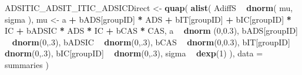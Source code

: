 \documentclass[10pt,dvipsnames,enabledeprecatedfontcommands]{scrartcl}
\newenvironment{Shaded}{\begin{snugshade}}{\end{snugshade}}
\newcommand{\KeywordTok}[1]{\textcolor[rgb]{0.13,0.29,0.53}{\textbf{#1}}}
\newcommand{\DataTypeTok}[1]{\textcolor[rgb]{0.13,0.29,0.53}{#1}}
\newcommand{\DecValTok}[1]{\textcolor[rgb]{0.00,0.00,0.81}{#1}}
\newcommand{\FloatTok}[1]{\textcolor[rgb]{0.00,0.00,0.81}{#1}}
\newcommand{\StringTok}[1]{\textcolor[rgb]{0.31,0.60,0.02}{#1}}
\newcommand{\OperatorTok}[1]{\textcolor[rgb]{0.81,0.36,0.00}{\textbf{#1}}}
\newcommand{\NormalTok}[1]{#1}
\begin{document}
\begin{Shaded}
\begin{Highlighting}[]
\NormalTok{ADSITIC_ADSIT_ITIC_ADSICDirect <-}\StringTok{ }\KeywordTok{quap}\NormalTok{(}
  \KeywordTok{alist}\NormalTok{(}
\NormalTok{    AdiffS }\OperatorTok{~}\StringTok{ }\KeywordTok{dnorm}\NormalTok{( mu, sigma ),}
\NormalTok{    mu <-}\StringTok{ }\NormalTok{a }\OperatorTok{+}\StringTok{ }\NormalTok{bADS[groupID] }\OperatorTok{*}\StringTok{ }\NormalTok{ADS }\OperatorTok{+}\StringTok{  }\NormalTok{bIT[groupID] }\OperatorTok{+}\StringTok{ }\NormalTok{bIC[groupID] }\OperatorTok{*}\StringTok{ }\NormalTok{IC }\OperatorTok{+}
\StringTok{      }\NormalTok{bADSIC }\OperatorTok{*}\StringTok{ }\NormalTok{ADS }\OperatorTok{*}\StringTok{ }\NormalTok{IC }\OperatorTok{+}\StringTok{ }\NormalTok{bCAS }\OperatorTok{*}\StringTok{ }\NormalTok{CAS,}
\NormalTok{    a }\OperatorTok{~}\StringTok{ }\KeywordTok{dnorm}\NormalTok{ (}\DecValTok{0}\NormalTok{,}\FloatTok{0.3}\NormalTok{),}
\NormalTok{    bADS[groupID] }\OperatorTok{~}\StringTok{ }\KeywordTok{dnorm}\NormalTok{(}\DecValTok{0}\NormalTok{,.}\DecValTok{3}\NormalTok{),}
\NormalTok{    bADSIC }\OperatorTok{~}\StringTok{ }\KeywordTok{dnorm}\NormalTok{(}\DecValTok{0}\NormalTok{,.}\DecValTok{3}\NormalTok{),}
\NormalTok{    bCAS }\OperatorTok{~}\StringTok{ }\KeywordTok{dnorm}\NormalTok{(}\DecValTok{0}\NormalTok{,}\FloatTok{0.3}\NormalTok{),}
\NormalTok{    bIT[groupID] }\OperatorTok{~}\StringTok{ }\KeywordTok{dnorm}\NormalTok{(}\DecValTok{0}\NormalTok{,.}\DecValTok{3}\NormalTok{),}
\NormalTok{    bIC[groupID] }\OperatorTok{~}\StringTok{ }\KeywordTok{dnorm}\NormalTok{(}\DecValTok{0}\NormalTok{,.}\DecValTok{3}\NormalTok{),}
\NormalTok{    sigma  }\OperatorTok{~}\StringTok{ }\KeywordTok{dexp}\NormalTok{(}\DecValTok{1}\NormalTok{)}
\NormalTok{  ), }
  \DataTypeTok{data =}\NormalTok{ summaries}
\NormalTok{)}



\end{Highlighting}
\end{Shaded}
\end{document}
